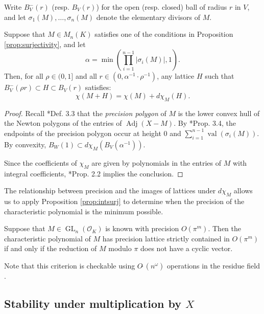 \documentclass{sig-alternate-05-2015}
\DeclareMathOperator{\GL}{GL}
\DeclareMathOperator{\val}{val}
\DeclareMathOperator{\adj}{Adj}
\newcommand{\OK}{\mathcal{O}_K}
\newcommand{\softO}{O\tilde{~}}
\begin{document}
Write $B^-_V(r)$ (resp. $B_V(r)$) for the open (resp. closed) ball of radius $r$ in $V$, and let
$\sigma_1(M), \dots, \sigma_n(M)$ denote the elementary divisors of $M$.

\begin{prop} \label{prop:mainlem}
Suppose that $M \in M_n(K)$ satisfies one of the conditions in Proposition \ref{prop:surjectivity}, and let 
\[
\alpha = \min\left(\prod_{i=1}^{n-1} \left\vert \sigma_i(M) \right\vert, 1\right).
\]
Then, for all $\rho \in (0, 1]$ and all
$r \in (0, \alpha^{-1} \cdot \rho^{-1})$, any lattice $H$ such that $B_V^-(\rho r) \subset H \subset B_V(r)$
satisfies:
\begin{equation}
\chi(M + H) = \chi(M) + d\chi_M(H).
\end{equation}
\end{prop}

\begin{proof}

Recall \cite{caruso-roe-vaccon:15a}*{Def. 3.3} that the \emph{precision polygon}
of $M$ is the lower convex hull of the Newton polygons of the entries of $\adj(X-M)$.
By \cite{caruso-roe-vaccon:15a}*{Prop. 3.4}, the endpoints of the precision polygon
occur at height $0$ and $\sum_{i=1}^{n-1} \val(\sigma_i(M))$.  By convexity,
$B_W(1) \subset d\chi_M(B_V(\alpha^{-1}))$.

Since the coefficients of $\chi_M$ are given by polynomials in the entries of $M$
with integral coefficients, \cite{caruso-roe-vaccon:15a}*{Prop. 2.2} implies
the conclusion.
\end{proof}

The relationship between precision and the images of lattices under $d\chi_M$ allows us to
apply Proposition \ref{prop:intsurj} to determine when the precision of the characteristic polynomial
is the minimum possible.

\begin{cor} \label{cor:prec_gain}
Suppose that $M \in \GL_n(\OK)$ is known with precision $O(\pi^m)$.
Then the characteristic polynomial of $M$ has precision lattice strictly contained in $O(\pi^m)$
if and only if the reduction of $M$ modulo $\pi$ does not have a cyclic vector.
\end{cor}

Note that this criterion is checkable using $\softO(n^\omega)$ operations in the residue field \cite{storjohann:01a}.

\subsection{Stability under multiplication by $X$}
\end{document}
